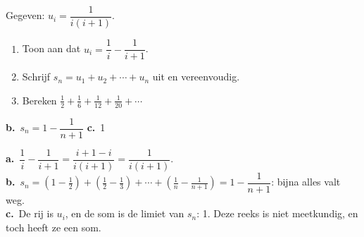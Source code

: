 \begin{oefeningen}
\begin{oefening}[3]
Gegeven: $u_i = \dfrac{1}{i(i+1)}$.
\begin{enumerate}
  \item Toon aan dat $u_i = \dfrac1i - \dfrac{1}{i+1}$.
  \item Schrijf $s_n = u_1 + u_2 + \cdots + u_n$ uit en vereenvoudig.
  \item Bereken $\tfrac12 + \tfrac16 + \tfrac{1}{12} + \tfrac{1}{20} + \cdots$
\end{enumerate}
\begin{solution}
\textbf{b.}~$s_n=1-\dfrac{1}{n+1}$ \quad \textbf{c.}~1
\end{solution}
\begin{fullsolution}
\textbf{a.}~$\dfrac1i-\dfrac{1}{i+1}=\dfrac{i+1-i}{i(i+1)}=\dfrac{1}{i(i+1)}$.\\
\textbf{b.}~$s_n=\left(1-\tfrac12\right)+\left(\tfrac12-\tfrac13\right)+\cdots+\left(\tfrac1n-\tfrac{1}{n+1}\right)=1-\dfrac{1}{n+1}$: bijna alles valt weg.\\
\textbf{c.}~De rij is $u_i$, en de som is de limiet van $s_n$: 1. Deze reeks is niet meetkundig, en toch heeft ze een som.
\end{fullsolution}
\end{oefening}
\end{oefeningen}



